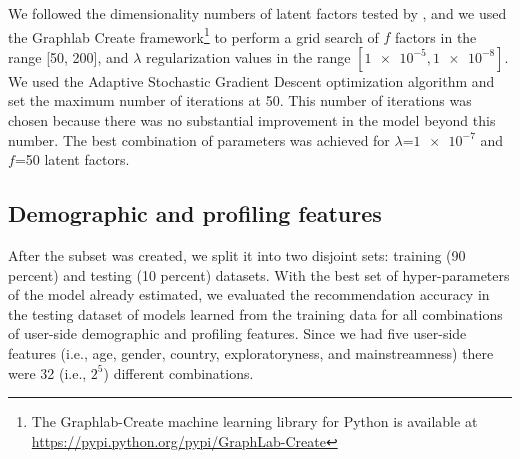 We followed the dimensionality numbers of latent factors tested by \textcite{koren09matrix,dror11yahooa}, and we used the Graphlab Create framework\footnote{The Graphlab-Create machine learning library for Python is available at \url{https://pypi.python.org/pypi/GraphLab-Create}} to perform a grid search of $f$ factors in the range [50, 200], and $\lambda$ regularization values in the range $[\num{1e-5},\num{1e-8}]$.  
We used the Adaptive Stochastic Gradient Descent optimization algorithm \autocite{duchi11adaptive} and set the maximum number of iterations at 50. This number of iterations was chosen because there was no substantial improvement in the model beyond this number.
The best combination of parameters was achieved for $\lambda$=$\num{1e-7}$ and $f$=50 latent factors. 






\subsection{Demographic and profiling features}
After the subset was created, we split it into two disjoint sets: training (90 percent) and testing (10 percent) datasets. 
With the best set of hyper-parame\-ters of the model already estimated, we evaluated the recommendation accuracy in the testing dataset of models learned from the training data for all combinations of user-side demographic and profiling features. 
Since we had five user-side features (i.e., age, gender, country, exploratoryness, and mainstreamness) there were 32 (i.e., $2^5$) different combinations. 

